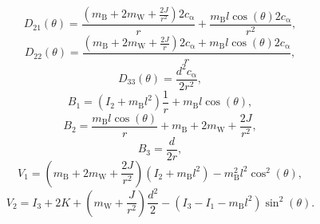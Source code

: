     \begin{equation}
        D_{\mathrm{21}}(\theta) = \frac{(m_{\mathrm{B}} + 2m_{\mathrm{W}} + \frac{2J}{r^2}) 2c_{\mathrm{\alpha}}}{r} + \frac{m_{\mathrm{B}} l \cos(\theta) 2c_{\mathrm{\alpha}}}{r^2},
    \end{equation}
    \begin{equation}
        D_{\mathrm{22}}(\theta) = \frac{(m_{\mathrm{B}} + 2m_{\mathrm{W}} + \frac{2J}{r}) 2c_{\mathrm{\alpha}} + m_{\mathrm{B}} l \cos(\theta) 2c_{\mathrm{\alpha}}}{r},
    \end{equation}
    \begin{equation}
        D_{\mathrm{33}}(\theta) = \frac{d^2 c_{\mathrm{\alpha}}}{2r^2 },
    \end{equation}
    \begin{equation}
        B_{\mathrm{1}} = (I_{\mathrm{2}} + m_{\mathrm{B}}l^2) \frac{1}{r} + m_{\mathrm{B}} l \cos(\theta),
    \end{equation}
    \begin{equation}
        B_{\mathrm{2}} = \frac{m_{\mathrm{B}} l \cos(\theta)}{r} + m_{\mathrm{B}} + 2m_{\mathrm{W}} + \frac{2J}{r^2},
    \end{equation}
    \begin{equation}
        B_{\mathrm{3}} = \frac{d}{2r},
    \end{equation}
    \begin{equation}
        V_{\mathrm{1}} = (m_{\mathrm{B}} + 2m_{\mathrm{W}} + \frac{2J}{r^2}) (I_{\mathrm{2}} + m_{\mathrm{B}}l^2) - m_{\mathrm{B}}^2l^2 \cos^2(\theta),
    \end{equation}
    \begin{equation}
        V_{\mathrm{2}} = I_{\mathrm{3}} + 2K + (m_{\mathrm{W}} + \frac{J}{r^2}) \frac{d^2}{2} - (I_{\mathrm{3}} - I_{\mathrm{1}} - m_{\mathrm{B}}l^2) \sin^2(\theta).
    \end{equation}

